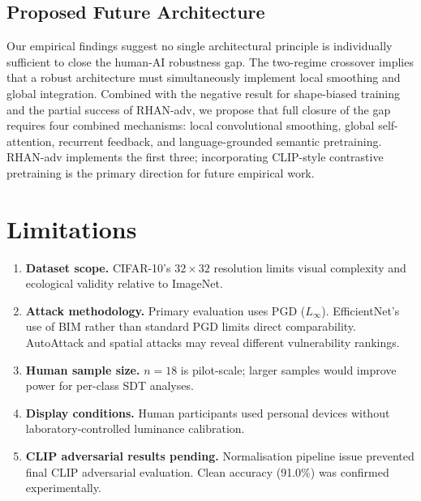 \documentclass[12pt,a4paper]{article}
\begin{document}
\subsection{Proposed Future Architecture}

Our empirical findings suggest no single architectural principle is
individually sufficient to close the human-AI robustness gap.
The two-regime crossover implies that a robust architecture must simultaneously
implement local smoothing and global integration.
Combined with the negative result for shape-biased training and the
partial success of RHAN-adv, we propose that full closure of the gap requires
four combined mechanisms: local convolutional smoothing, global self-attention,
recurrent feedback, and language-grounded semantic pretraining.
RHAN-adv implements the first three; incorporating CLIP-style contrastive
pretraining is the primary direction for future empirical work.

\section{Limitations}
\label{sec:limitations}

\begin{enumerate}[leftmargin=1.5em]
  \item \textbf{Dataset scope.}
        CIFAR-10's $32{\times}32$ resolution limits visual complexity and
        ecological validity relative to ImageNet.
  \item \textbf{Attack methodology.}
        Primary evaluation uses PGD ($L_\infty$).
        EfficientNet's use of BIM rather than standard PGD limits direct
        comparability. AutoAttack and spatial attacks may reveal different
        vulnerability rankings.
  \item \textbf{Human sample size.}
        $n{=}18$ is pilot-scale; larger samples would improve power for
        per-class SDT analyses.
  \item \textbf{Display conditions.}
        Human participants used personal devices without laboratory-controlled
        luminance calibration.
  \item \textbf{CLIP adversarial results pending.}
        Normalisation pipeline issue prevented final CLIP adversarial
        evaluation. Clean accuracy (91.0\%) was confirmed experimentally.
\end{enumerate}
\end{document}
